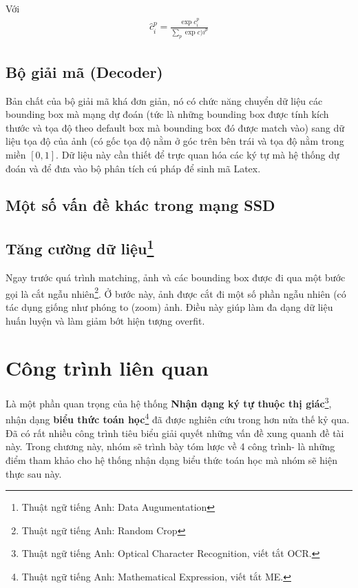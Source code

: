 \documentclass[a4paper,12pt]{article}
\begin{document}
	Với \begin{align}\hat{c}_i^p = \frac{\exp{c_i^p}}{\sum_p \exp{c)i^p}}\end{align}
	
	\subsection{Bộ giải mã (Decoder)}
	
	Bản chất của bộ giải mã khá đơn giản, nó có chức năng chuyển dữ liệu các bounding box mà mạng dự đoán (tức là những bounding box được tính kích thước và tọa độ theo default box mà bounding box đó được match vào) sang dữ liệu tọa độ của ảnh (có gốc tọa độ nằm ở góc trên bên trái và tọa độ nằm trong miền $[0, 1]$. Dữ liệu này cần thiết để trực quan hóa các ký tự mà hệ thống dự đoán và để đưa vào bộ phân tích cú pháp để sinh mã Latex.
	
	\subsection{Một số vấn đề khác trong mạng SSD\cite{liu2016ssd}}
	\subsection*{Tăng cường dữ liệu\footnote{Thuật ngữ tiếng Anh: Data Augumentation}}
	
	Ngay trước quá trình matching, ảnh và các bounding box được đi qua một bước gọi là cắt ngẫu nhiên\footnote{Thuật ngữ tiếng Anh: Random Crop}. Ở bước này, ảnh được cắt đi một số phần ngẫu nhiên (có tác dụng giống như phóng to (zoom) ảnh. Điều này giúp làm đa dạng dữ liệu huấn luyện và làm giảm bớt hiện tượng overfit.
	
	
	
	
	
	\newpage
	\section{Công trình liên quan}
	Là một phần quan trọng của hệ thống \textbf{Nhận dạng ký tự thuộc thị giác}\footnote{Thuật ngữ tiếng Anh: Optical Character Recognition, viết tắt OCR.}, nhận dạng \textbf{biểu thức toán học}\footnote{Thuật ngữ tiếng Anh: Mathematical Expression, viết tắt ME.} đã được nghiên cứu trong hơn nửa thế kỷ qua. Đã có rất nhiều công trình tiêu biểu giải quyết những vấn đề xung quanh đề tài này. Trong chương này, nhóm sẽ trình bày tóm lược về 4 công trình- là những điểm tham khảo cho hệ thống nhận dạng biểu thức toán học mà nhóm sẽ hiện thực sau này.\\
\end{document}
